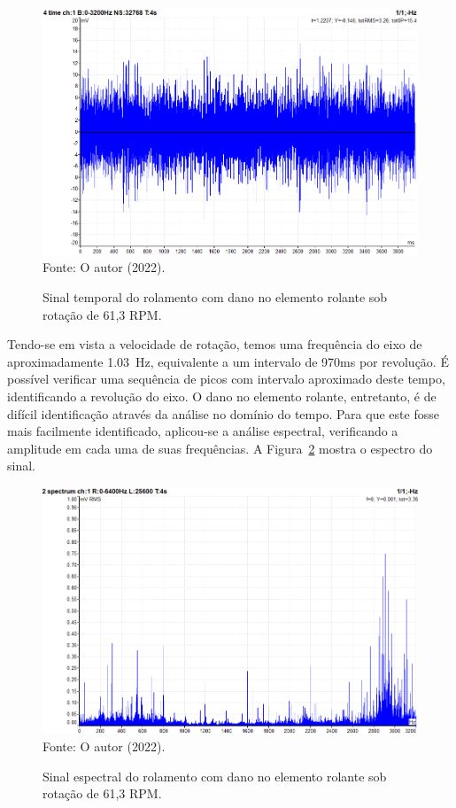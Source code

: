 \documentclass[
	12pt,				
	oneside,			
	a4paper,			
	english,			
	brazil,			
	]{abntex2ppgsi}
\begin{document}
\begin{figure}[H]
\centering
\caption {Sinal temporal do rolamento com dano no elemento rolante sob rotação de 61,3 RPM.}
\includegraphics[width=\textwidth,keepaspectratio]{dominio_tempo_defeito_rolante_acelerometro_100hz} \\
Fonte: O autor (2022).
\label{dominio_tempo_defeito_rolante_acelerometro_100hz}
\end{figure}

Tendo-se em vista a velocidade de rotação, temos uma frequência do eixo de aproximadamente \SI{1,03}{\hertz}, equivalente a um intervalo de 970ms por revolução. É possível verificar uma sequência de picos com intervalo aproximado deste tempo, identificando a revolução do eixo. O dano no elemento rolante, entretanto, é de difícil identificação através da análise no domínio do tempo. Para que este fosse mais facilmente identificado, aplicou-se a análise espectral, verificando a amplitude em cada uma de suas frequências. A Figura~\ref{espectro_rolamento_dano_rolante_mc6v_mv} mostra o espectro do sinal. 

\begin{figure}[H]
\centering
\caption {Sinal espectral do rolamento com dano no elemento rolante sob rotação de 61,3 RPM.}
\includegraphics[width=\textwidth,keepaspectratio]{espectro_rolamento_dano_rolante_mc6v_mv} \\
Fonte: O autor (2022).
\label{espectro_rolamento_dano_rolante_mc6v_mv}
\end{figure}
\end{document}
